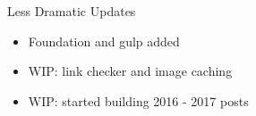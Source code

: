 \begin{frame}{Less Dramatic Updates}
    \begin{itemize}
        \item Foundation and gulp added
        \item WIP: link checker and image caching
        \item WIP: started building 2016 - 2017 posts
    \end{itemize}
\end{frame}





